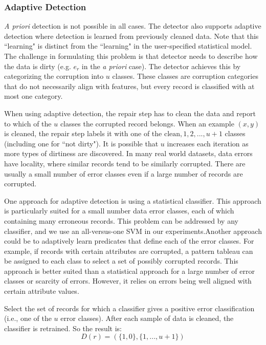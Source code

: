 \subsubsection{Adaptive Detection}
\emph{A priori} detection is not possible in all cases.
The detector also supports adaptive detection where detection is learned from previously cleaned data.
Note that this ``learning" is distinct from the ``learning" in the user-specified statistical model.
The challenge in formulating this problem is that detector needs to describe how the data is dirty (e.g. $e_r$ in the \emph{a priori} case).
The detector achieves this by categorizing the corruption into $u$ classes.
These classes are corruption categories that do not necessarily align with features, but every record is classified with at most one category.

When using adaptive detection, the repair step has to clean the data and report to which of the $u$ classes the corrupted record belongs.
When an example $(x,y)$ is cleaned, the repair step labels it with one of the ${\text{clean}, 1,2,...,u+1}$ classes (including one for ``not dirty").
It is possible that $u$ increases each iteration as more types of dirtiness are discovered.
In many real world datasets, data errors have locality, where similar records tend to be similarly corrupted.
There are usually a small number of error classes even if a large number of records are corrupted.

One approach for adaptive detection is using a statistical classifier. 
This approach is particularly suited for a small number data error classes, each of which containing many erroneous records.
This problem can be addressed by any classifier, and we use an all-versus-one SVM in our experiments.Another approach could be to adaptively learn predicates that define each of the error classes.
For example, if records with certain attributes are corrupted, a pattern tableau can be assigned to each class to select a set of possibly corrupted records.
This approach is better suited than a statistical approach for a large number of error classes or scarcity of errors.
However, it relies on errors being well aligned with certain attribute values.

\begin{definition}
Select the set of records for which a classifier gives a positive error classification (i.e., one of the $u$ error classes).
After each sample of data is cleaned, the classifier is retrained.
So the result is:
\[D(r) = (\{1,0\},\{1,...,u+1\})\]
\end{definition}

